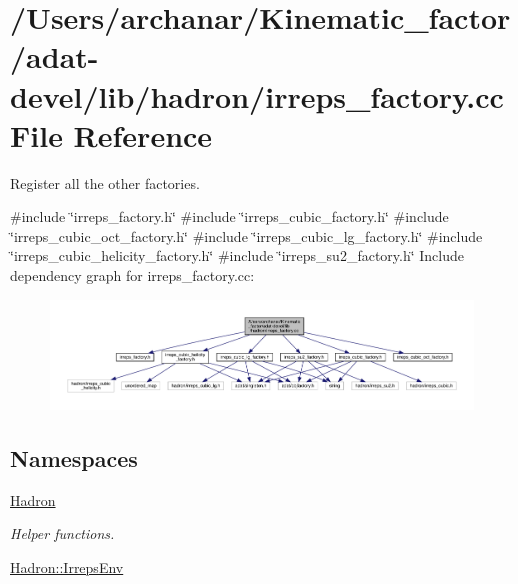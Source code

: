 \hypertarget{adat-devel_2lib_2hadron_2irreps__factory_8cc}{}\section{/\+Users/archanar/\+Kinematic\+\_\+factor/adat-\/devel/lib/hadron/irreps\+\_\+factory.cc File Reference}
\label{adat-devel_2lib_2hadron_2irreps__factory_8cc}


Register all the other factories.  


{\ttfamily \#include \char`\"{}irreps\+\_\+factory.\+h\char`\"{}}\newline
{\ttfamily \#include \char`\"{}irreps\+\_\+cubic\+\_\+factory.\+h\char`\"{}}\newline
{\ttfamily \#include \char`\"{}irreps\+\_\+cubic\+\_\+oct\+\_\+factory.\+h\char`\"{}}\newline
{\ttfamily \#include \char`\"{}irreps\+\_\+cubic\+\_\+lg\+\_\+factory.\+h\char`\"{}}\newline
{\ttfamily \#include \char`\"{}irreps\+\_\+cubic\+\_\+helicity\+\_\+factory.\+h\char`\"{}}\newline
{\ttfamily \#include \char`\"{}irreps\+\_\+su2\+\_\+factory.\+h\char`\"{}}\newline
Include dependency graph for irreps\+\_\+factory.\+cc\+:
\nopagebreak
\begin{figure}[H]
\begin{center}
\leavevmode
\includegraphics[width=350pt]{d0/dd7/adat-devel_2lib_2hadron_2irreps__factory_8cc__incl}
\end{center}
\end{figure}
\subsection*{Namespaces}
\begin{DoxyCompactItemize}
\item 
 \mbox{\hyperlink{namespaceHadron}{Hadron}}
\begin{DoxyCompactList}\small\item\em Helper functions. \end{DoxyCompactList}\item 
 \mbox{\hyperlink{namespaceHadron_1_1IrrepsEnv}{Hadron\+::\+Irreps\+Env}}
\end{DoxyCompactItemize}
